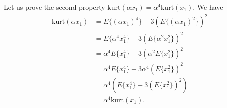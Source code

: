 \begin{enumerate}
\begin{solution}

    Let us prove the second property $\mathrm{kurt}(\alpha x_1) = \alpha^4
    \mathrm{kurt}(x_1)$.  We have
    \begin{align*}
      \mathrm{kurt}(\alpha x_1) &= E\{(\alpha x_1)^4\} - 3(E\{(\alpha
      x_1)^2\})^2
      \\
      &= E\{\alpha^4 x_1^4\} - 3(E\{\alpha^2 x_1^2\})^2
      \\
      &= \alpha^4 E\{x_1^4\} - 3(\alpha^2 E\{x_1^2\})^2
      \\
      &= \alpha^4 E\{x_1^4\} - 3\alpha^4 (E\{x_1^2\})^2
      \\
      &= \alpha^4 (E\{x_1^4\} - 3(E\{x_1^2\})^2)
      \\
      &= \alpha^4 \mathrm{kurt}(x_1).
    \end{align*}
  

  \end{solution}


\end{enumerate}
